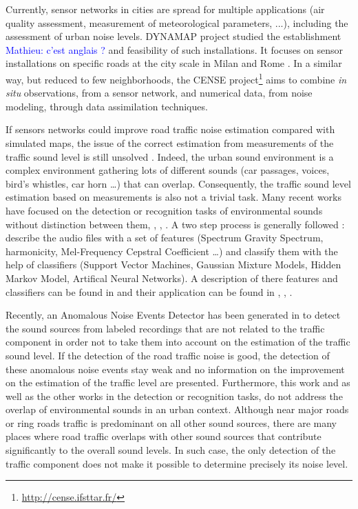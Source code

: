 \documentclass[twocolumn,a4paper,10pt]{article}
\newcommand{\ml}[1]{\textcolor{blue}{ Mathieu: #1}}
\begin{document}
Currently, sensor networks in cities are spread for multiple applications (air quality assessment, measurement of meteorological parameters, ...), including the assessment of urban noise levels. DYNAMAP project \cite{dynamap_2016} studied the establishment \ml{c'est anglais ?} and feasibility of such installations. It focuses on sensor installations on specific roads at the city scale in Milan and Rome \cite{bellucci_life_2017}. In a similar way, but reduced to few neighborhoods, the CENSE project\footnote{\url{http://cense.ifsttar.fr/}} \cite{picaut2017characterization} aims to combine \textit{in situ} observations, from a sensor network, and numerical data, from noise modeling, through data assimilation techniques.

If sensors networks could improve road traffic noise estimation compared with simulated maps, the issue of the correct estimation from  measurements of the traffic sound level is still unsolved \cite{Mioduszewski}. Indeed, the urban sound environment is a complex environment gathering lots of different sounds (car passages, voices, bird's whistles, car horn \dots) that can overlap. Consequently, the traffic sound level estimation based on measurements is also not a trivial task.
Many recent works have focused on the detection or recognition tasks of environmental sounds without distinction between them\cite{heittola_sound_2011}, \cite{defreville_automatic_2006}, \cite{dufaux_automatic_2000}, \cite{chu_environmental_2009}. A two step process is generally followed : describe the audio files with a set of features (Spectrum Gravity Spectrum, harmonicity, Mel-Frequency Cepstral Coefficient \dots) and classify them with the help of classifiers (Support Vector Machines, Gaussian Mixture Models, Hidden Markov Model, Artifical Neural Networks). A description of there features and classifiers can be found in \cite{cowling_comparison_2003} and their application can be found in \cite{shen_environmental_2012}, \cite{beritelli_pattern_2008}, \cite{couvreur_automatic_2004}.

Recently, an Anomalous Noise Events Detector has been generated in \cite{socoro_anomalous_2017} to detect the sound sources from labeled recordings that are not related to the traffic component in order not to take them into account on the estimation of the traffic sound level. If the detection of the road traffic noise is good, the detection of these anomalous noise events stay weak and no information on the improvement on the estimation of the traffic  level are presented. Furthermore, this work and as well as the other works in the detection or recognition tasks, do not address the overlap of environmental sounds in an urban context. Although near major roads or ring roads traffic is predominant on all other sound sources, there are many places where road traffic overlaps with other sound sources that contribute significantly to the overall sound levels. In such case, the only detection of the traffic component does not make it possible to determine precisely its noise level.
\end{document}
